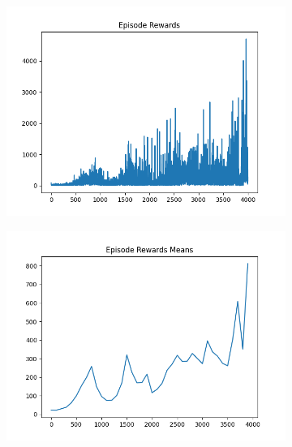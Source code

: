 \begin{figure}[H]
\begin{subfigure}{.47\linewidth}
        \includegraphics[width=\textwidth]{pole/2024-06-14_11-09-14_dqn_cartpole_episode_rewards.png}
    \end{subfigure}
    \begin{subfigure}{.47\linewidth}
        \centering
        \includegraphics[width=\textwidth]{pole/2024-06-14_11-09-14_dqn_cartpole_episode_rewards_means.png}
    \end{subfigure}
\end{figure}
